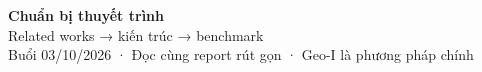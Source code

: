 \documentclass[10pt,a4paper]{article}
\begin{document}
\begin{center}
{\LARGE\bfseries\color{ink}Chuẩn bị thuyết trình}\\[5pt]
{\large Related works → kiến trúc → benchmark}\\[3pt]
{\small Buổi 03/10/2026 · Đọc cùng report rút gọn · Geo-I là phương pháp chính}
\end{center}



\clearpage


\clearpage

\end{document}
